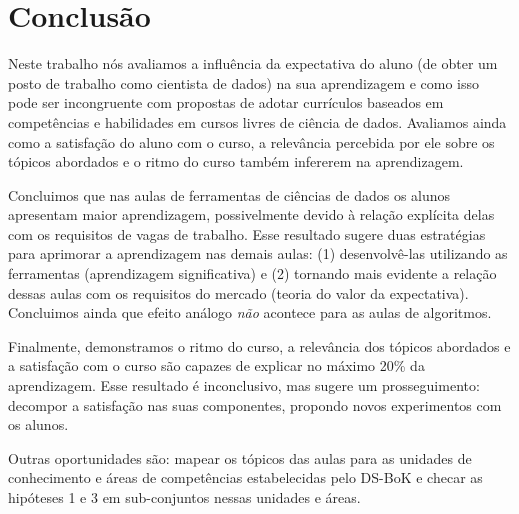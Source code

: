\section{Conclusão}

Neste trabalho nós avaliamos a influência da expectativa do aluno (de obter um posto de trabalho como cientista de dados) na sua aprendizagem e como isso pode ser incongruente com propostas de adotar currículos baseados em competências e habilidades em cursos livres de ciência de dados.
Avaliamos ainda como a satisfação do aluno com o curso, a relevância percebida por ele sobre os tópicos abordados e o ritmo do curso também infererem na aprendizagem.

Concluimos que nas aulas de ferramentas de ciências de dados os alunos apresentam maior aprendizagem, possivelmente devido à relação explícita delas com os requisitos de vagas de trabalho.
Esse resultado sugere duas estratégias para aprimorar a aprendizagem nas demais aulas: (1) desenvolvê-las utilizando as ferramentas (aprendizagem significativa) e (2) tornando mais evidente a relação dessas aulas com os requisitos do mercado (teoria do valor da expectativa).
Concluimos ainda que efeito análogo \emph{não} acontece para as aulas de algoritmos.

Finalmente, demonstramos o ritmo do curso, a relevância dos tópicos abordados e a satisfação com o curso são capazes de explicar no máximo 20\% da aprendizagem.
Esse resultado é inconclusivo, mas sugere um prosseguimento: decompor a satisfação nas suas componentes, propondo novos experimentos com os alunos.

Outras oportunidades são: mapear os tópicos das aulas para as unidades de conhecimento e áreas de competências estabelecidas pelo DS-BoK \cite{Demchenko2017} e checar as hipóteses 1 e 3 em sub-conjuntos nessas unidades e áreas.
